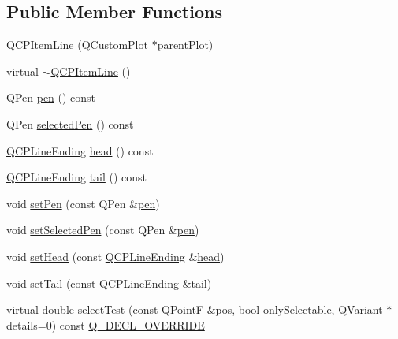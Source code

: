 \subsection*{Public Member Functions}
\begin{DoxyCompactItemize}
\item 
\mbox{\hyperlink{class_q_c_p_item_line_a17804b7f64961c6accf25b61e85142e3}{Q\+C\+P\+Item\+Line}} (\mbox{\hyperlink{class_q_custom_plot}{Q\+Custom\+Plot}} $\ast$\mbox{\hyperlink{class_q_c_p_layerable_a473edb813a4c1929d6b6a8fe3ff3faf7}{parent\+Plot}})
\item 
virtual \mbox{\hyperlink{class_q_c_p_item_line_a94b5aaae048171e5306dc4695b991283}{$\sim$\+Q\+C\+P\+Item\+Line}} ()
\item 
Q\+Pen \mbox{\hyperlink{class_q_c_p_item_line_a712e5a7f59db3f4c588dfc370a63e225}{pen}} () const
\item 
Q\+Pen \mbox{\hyperlink{class_q_c_p_item_line_ae1782c4fbecd38054ec3d49d8572a5e5}{selected\+Pen}} () const
\item 
\mbox{\hyperlink{class_q_c_p_line_ending}{Q\+C\+P\+Line\+Ending}} \mbox{\hyperlink{class_q_c_p_item_line_a6cdc9e87e17418d4b0e66eaa0f041407}{head}} () const
\item 
\mbox{\hyperlink{class_q_c_p_line_ending}{Q\+C\+P\+Line\+Ending}} \mbox{\hyperlink{class_q_c_p_item_line_ac085d3939ec11d7a4d592dc2ed578360}{tail}} () const
\item 
void \mbox{\hyperlink{class_q_c_p_item_line_a572528dab61c1abe205822fbd5db4b27}{set\+Pen}} (const Q\+Pen \&\mbox{\hyperlink{class_q_c_p_item_line_a712e5a7f59db3f4c588dfc370a63e225}{pen}})
\item 
void \mbox{\hyperlink{class_q_c_p_item_line_a3e2fec44503277e77717e9c24f87f1ea}{set\+Selected\+Pen}} (const Q\+Pen \&\mbox{\hyperlink{class_q_c_p_item_line_a712e5a7f59db3f4c588dfc370a63e225}{pen}})
\item 
void \mbox{\hyperlink{class_q_c_p_item_line_aebf3d687114d584e0459db6759e2c3c3}{set\+Head}} (const \mbox{\hyperlink{class_q_c_p_line_ending}{Q\+C\+P\+Line\+Ending}} \&\mbox{\hyperlink{class_q_c_p_item_line_a6cdc9e87e17418d4b0e66eaa0f041407}{head}})
\item 
void \mbox{\hyperlink{class_q_c_p_item_line_ac264222c3297a7efe33df9345c811a5f}{set\+Tail}} (const \mbox{\hyperlink{class_q_c_p_line_ending}{Q\+C\+P\+Line\+Ending}} \&\mbox{\hyperlink{class_q_c_p_item_line_ac085d3939ec11d7a4d592dc2ed578360}{tail}})
\item 
virtual double \mbox{\hyperlink{class_q_c_p_item_line_a8e02bfbca04fbcf3dbc375a2bf693229}{select\+Test}} (const Q\+PointF \&pos, bool only\+Selectable, Q\+Variant $\ast$details=0) const \mbox{\hyperlink{qcustomplot_8h_a42cc5eaeb25b85f8b52d2a4b94c56f55}{Q\+\_\+\+D\+E\+C\+L\+\_\+\+O\+V\+E\+R\+R\+I\+DE}}
\end{DoxyCompactItemize}
